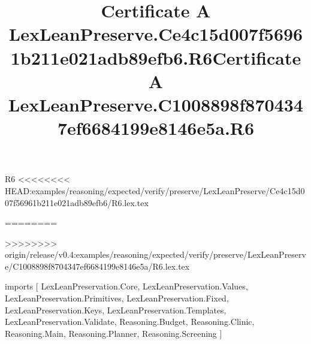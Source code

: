 \begin{lexlean}{R6}
<<<<<<<< HEAD:examples/reasoning/expected/verify/preserve/LexLeanPreserve/Ce4c15d007f56961b211e021adb89efb6/R6.lex.tex
\title{Certificate A LexLeanPreserve.Ce4c15d007f56961b211e021adb89efb6.R6}
========
\title{Certificate A LexLeanPreserve.C1008898f8704347ef6684199e8146e5a.R6}
>>>>>>>> origin/release/v0.4:examples/reasoning/expected/verify/preserve/LexLeanPreserve/C1008898f8704347ef6684199e8146e5a/R6.lex.tex
\begin{coremodule}
imports [
  LexLeanPreservation.Core,
  LexLeanPreservation.Values,
  LexLeanPreservation.Primitives,
  LexLeanPreservation.Fixed,
  LexLeanPreservation.Keys,
  LexLeanPreservation.Templates,
  LexLeanPreservation.Validate,
  Reasoning.Budget,
  Reasoning.Clinic,
  Reasoning.Main,
  Reasoning.Planner,
  Reasoning.Screening
]


\end{coremodule}
\end{lexlean}
